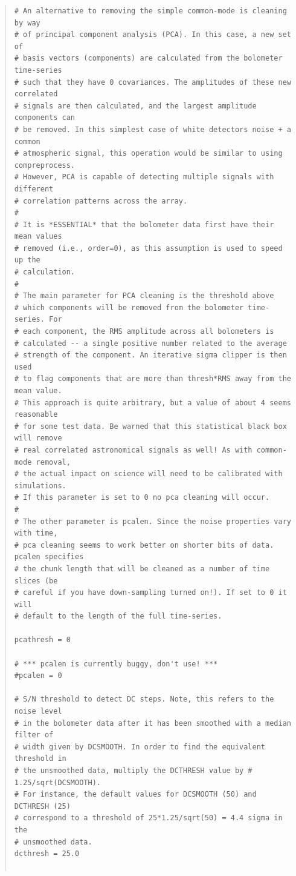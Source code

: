 \documentclass[twoside,11pt]{article}
\renewcommand{\_}{\texttt{\symbol{95}}}
\newenvironment{myquote}{\begin{quote}\begin{small}}{\end{small}\end{quote}}
\begin{document}
\begin{myquote}
\begin{verbatim}
# An alternative to removing the simple common-mode is cleaning by way
# of principal component analysis (PCA). In this case, a new set of
# basis vectors (components) are calculated from the bolometer time-series
# such that they have 0 covariances. The amplitudes of these new correlated
# signals are then calculated, and the largest amplitude components can
# be removed. In this simplest case of white detectors noise + a common
# atmospheric signal, this operation would be similar to using compreprocess.
# However, PCA is capable of detecting multiple signals with different
# correlation patterns across the array.
#
# It is *ESSENTIAL* that the bolometer data first have their mean values
# removed (i.e., order=0), as this assumption is used to speed up the
# calculation.
#
# The main parameter for PCA cleaning is the threshold above
# which components will be removed from the bolometer time-series. For
# each component, the RMS amplitude across all bolometers is
# calculated -- a single positive number related to the average
# strength of the component. An iterative sigma clipper is then used
# to flag components that are more than thresh*RMS away from the mean value.
# This approach is quite arbitrary, but a value of about 4 seems reasonable
# for some test data. Be warned that this statistical black box will remove
# real correlated astronomical signals as well! As with common-mode removal,
# the actual impact on science will need to be calibrated with simulations.
# If this parameter is set to 0 no pca cleaning will occur.
#
# The other parameter is pcalen. Since the noise properties vary with time,
# pca cleaning seems to work better on shorter bits of data. pcalen specifies
# the chunk length that will be cleaned as a number of time slices (be
# careful if you have down-sampling turned on!). If set to 0 it will
# default to the length of the full time-series.

pcathresh = 0

# *** pcalen is currently buggy, don't use! ***
#pcalen = 0

# S/N threshold to detect DC steps. Note, this refers to the noise level
# in the bolometer data after it has been smoothed with a median filter of
# width given by DCSMOOTH. In order to find the equivalent threshold in
# the unsmoothed data, multiply the DCTHRESH value by # 1.25/sqrt(DCSMOOTH).
# For instance, the default values for DCSMOOTH (50) and DCTHRESH (25)
# correspond to a threshold of 25*1.25/sqrt(50) = 4.4 sigma in the
# unsmoothed data.
dcthresh = 25.0


\end{verbatim}
\end{myquote}
\end{document}
